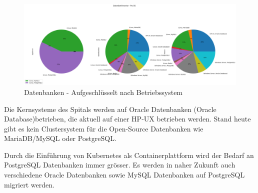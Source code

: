 \begin{flushleft}
    
\end{flushleft}
\begin{flushleft}
    \begin{figure}[H]
        \centering
        \includegraphics[width=1\linewidth]{source/pandas_data_chart_plotter/db_inventory_per_os}
        \caption{Datenbanken - Aufgeschlüsselt nach Betriebssystem}
        \label{fig:db_inventory_per_os}
    \end{figure}
\end{flushleft}
\begin{flushleft}
    Die Kernsysteme des Spitals werden auf Oracle Datenbanken (\Gls{Oracle Database})betrieben, die aktuell auf einer \Gls{HP-UX} betrieben werden.
    Stand heute gibt es kein Clustersystem für die Open-Source Datenbanken wie \Gls{MariaDB}/\Gls{MySQL} oder \Gls{PostgreSQL}\@.
\end{flushleft}
\begin{flushleft}
    Durch die Einführung von \Gls{Kubernetes} als Containerplattform wird der Bedarf an \Gls{PostgreSQL} Datenbanken immer grösser.
    Es werden in naher Zukunft auch verschiedene Oracle Datenbanken sowie \Gls{MySQL} Datenbanken auf \Gls{PostgreSQL} migriert werden.
\end{flushleft}
